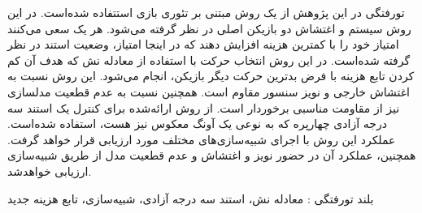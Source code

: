 


\pagestyle{empty}

\begin{وسط‌چین}
\end{وسط‌چین}

‌تورفتگی در این پژوهش از یک روش مبتنی بر تئوری بازی استتفاده شده‌است. در این روش سیستم و اغتشاش دو بازیکن اصلی در نظر گرفته می‌شود. هر یک سعی می‌کنند امتیاز خود را  با کمترین هزینه افزایش دهند که در اینجا امتیاز، وضعیت استند در نظر گرفته ‌شده‌است. در این روش انتخاب حرکت با استفاده از معادله نش
 که هدف آن کم کردن تابع هزینه با فرض بدترین حرکت دیگر بازیکن، انجام می‌شود.
این روش نسبت به اغتشاش خارجی و 
نویز سنسور مقاوم است. همچنین نسبت به عدم قطعیت مدلسازی نیز از مقاومت مناسبی برخوردار است. از روش ارائه‌شده برای کنترل یک استند سه درجه آزادی چهارپره که به نوعی یک آونگ معكوس نیز هست، استفاده شده‌است. 
عملكرد این روش با اجرای شبیه‌سازی‌های مختلف مورد ارزیابی قرار خواهد گرفت. همچنین، عملكرد آن 
در حضور نویز و اغتشاش و عدم قطعیت مدل از طریق شبیه‌سازی ارزیابی خواهد‌شد.

‌بلند
‌تورفتگی : 
معادله نش، استند سه درجه آزادی، شبیه‌سازی، تابع هزینه
‌جدید
